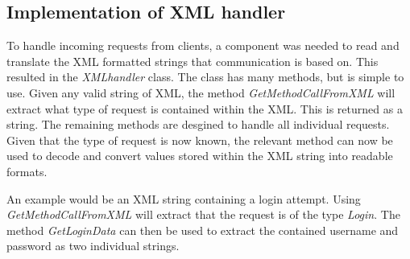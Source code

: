 \subsection{Implementation of XML handler}
\label{sec:xmlhandlerimpl}
To handle incoming requests from clients, a component was needed to read and translate the XML formatted strings that communication is based on. This resulted in the \textit{XMLhandler} class. The class has many methods, but is simple to use. Given any valid string of XML, the method \textit{GetMethodCallFromXML} will extract what type of request is contained within the XML. This is returned as a string. The remaining methods are desgined to handle all individual requests. Given that the type of request is now known, the relevant method can now be used to decode and convert values stored within the XML string into readable formats.

An example would be an XML string containing a login attempt. Using \textit{GetMethodCallFromXML} will extract that the request is of the type \textit{Login}. The method \textit{GetLoginData} can then be used to extract the contained username and password as two individual strings.